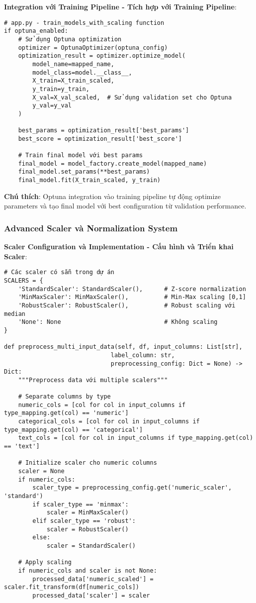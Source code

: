 \textbf{Integration với Training Pipeline - Tích hợp với Training Pipeline}:

\begin{verbatim}
# app.py - train_models_with_scaling function
if optuna_enabled:
    # Sử dụng Optuna optimization
    optimizer = OptunaOptimizer(optuna_config)
    optimization_result = optimizer.optimize_model(
        model_name=mapped_name,
        model_class=model.__class__,
        X_train=X_train_scaled,
        y_train=y_train,
        X_val=X_val_scaled,  # Sử dụng validation set cho Optuna
        y_val=y_val
    )
    
    best_params = optimization_result['best_params']
    best_score = optimization_result['best_score']
    
    # Train final model với best params
    final_model = model_factory.create_model(mapped_name)
    final_model.set_params(**best_params)
    final_model.fit(X_train_scaled, y_train)
\end{verbatim}

\textbf{Chú thích}: Optuna integration vào training pipeline tự động optimize parameters và tạo final model với best configuration từ validation performance.

\subsubsection{Advanced Scaler và Normalization System}

\textbf{Scaler Configuration và Implementation - Cấu hình và Triển khai Scaler}:

\begin{verbatim}
# Các scaler có sẵn trong dự án
SCALERS = {
    'StandardScaler': StandardScaler(),      # Z-score normalization
    'MinMaxScaler': MinMaxScaler(),          # Min-Max scaling [0,1]
    'RobustScaler': RobustScaler(),          # Robust scaling với median
    'None': None                             # Không scaling
}

def preprocess_multi_input_data(self, df, input_columns: List[str], 
                              label_column: str, 
                              preprocessing_config: Dict = None) -> Dict:
    """Preprocess data với multiple scalers"""
    
    # Separate columns by type
    numeric_cols = [col for col in input_columns if type_mapping.get(col) == 'numeric']
    categorical_cols = [col for col in input_columns if type_mapping.get(col) == 'categorical']
    text_cols = [col for col in input_columns if type_mapping.get(col) == 'text']
    
    # Initialize scaler cho numeric columns
    scaler = None
    if numeric_cols:
        scaler_type = preprocessing_config.get('numeric_scaler', 'standard')
        if scaler_type == 'minmax':
            scaler = MinMaxScaler()
        elif scaler_type == 'robust':
            scaler = RobustScaler()
        else:
            scaler = StandardScaler()
    
    # Apply scaling
    if numeric_cols and scaler is not None:
        processed_data['numeric_scaled'] = scaler.fit_transform(df[numeric_cols])
        processed_data['scaler'] = scaler
\end{verbatim}

